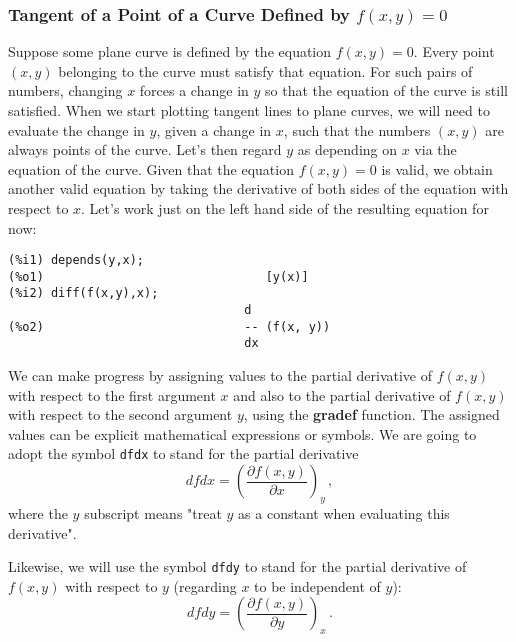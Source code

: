 \documentclass[12pt]{article}
\begin{document}
\subsubsection{Tangent of a Point of a Curve Defined by $f(x,y) = 0$} \label{gradef}
Suppose some plane curve is defined by the equation $f(x,y) = 0$.
Every point $(x,y)$ belonging to the curve must satisfy that equation.
For such pairs of numbers, changing $x$ forces a change in $y$ so that
  the equation of the curve is still satisfied. 
When we start plotting tangent lines to plane curves, we will need to
  evaluate the change in $y$, given a change in $x$, such that the numbers
  $(x,y)$ are always points of the curve.
Let's then regard $y$ as depending on $x$ via the equation of the curve.
Given that the equation $f(x,y) = 0$ is valid, we obtain another valid
  equation by taking the derivative of both sides of the equation with
  respect to $x$.
Let's work just on the left hand side of the resulting equation for
  now:
\small
\begin{verbatim}
(%i1) depends(y,x);
(%o1)                               [y(x)]
(%i2) diff(f(x,y),x);
                                 d
(%o2)                            -- (f(x, y))
                                 dx
\end{verbatim}
\normalsize
We can make progress by assigning values to the partial derivative of $f(x,y)$ with respect to
  the first argument $x$ and also to the partial derivative of $f(x,y)$ with respect to the
  second argument $y$, using the \textbf{gradef} function.
The assigned values can be explicit mathematical expressions or symbols.
We are going to adopt the symbol \verb|dfdx| to stand for the
  partial derivative 
$$  dfdx  =  \left(\frac{\partial f(x,y)}{\partial x}  \right)_{y}\, ,  $$
where the $y$ subscript means "treat $y$ as a constant when evaluating this 
  derivative".
  
\smallskip
Likewise, we will use the symbol \verb|dfdy| to stand for the partial derivative of
  $f(x,y)$ with respect to $y$ (regarding $x$ to be independent of $y$):
$$   dfdy  =  \left(\frac{\partial f(x,y)}{\partial y}  \right)_{x}\, .  $$
\end{document}
